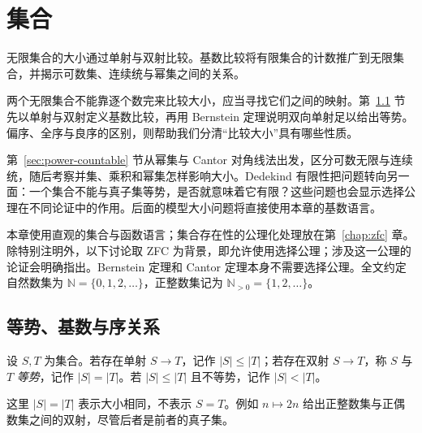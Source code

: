 \documentclass[lang=cn,a4paper,fontset=none,zihao=false,10pt,openany,twoside]{beautybook}
\numberwithin{algorithm}{chapter}
\newcommand{\N}{\mathbb N}
\begin{document}
\frontmatter
\tableofcontents
{}
\mainmatter
\chapter{集合}\label{chap:sets}
\begin{wenxintishi}
无限集合的大小通过单射与双射比较。基数比较将有限集合的计数推广到无限集合，并揭示可数集、连续统与幂集之间的关系。
\end{wenxintishi}
两个无限集合不能靠逐个数完来比较大小，应当寻找它们之间的映射。第~\ref{sec:cardinal-order} 节先以单射与双射定义基数比较，再用 Bernstein 定理说明双向单射足以给出等势。偏序、全序与良序的区别，则帮助我们分清“比较大小”具有哪些性质。

第~\ref{sec:power-countable} 节从幂集与 Cantor 对角线法出发，区分可数无限与连续统，随后考察并集、乘积和幂集怎样影响大小。Dedekind 有限性把问题转向另一面：一个集合不能与真子集等势，是否就意味着它有限？这些问题也会显示选择公理在不同论证中的作用。后面的模型大小问题将直接使用本章的基数语言。

\begin{center}
\end{center}

本章使用直观的集合与函数语言；集合存在性的公理化处理放在第~\ref{chap:zfc} 章。除特别注明外，以下讨论取 ZFC 为背景，即允许使用选择公理；涉及这一公理的论证会明确指出。Bernstein 定理和 Cantor 定理本身不需要选择公理。全文约定自然数集为 $\N=\{0,1,2,\ldots\}$，正整数集记为 $\N_{>0}=\{1,2,\ldots\}$。
\section{等势、基数与序关系}\label{sec:cardinal-order}
\begin{definition}
设 $S,T$ 为集合。若存在单射 $S\to T$，记作 $|S|\leq |T|$；若存在双射 $S\to T$，称 $S$ 与 $T$ \emph{等势}，记作 $|S|=|T|$。若 $|S|\leq|T|$ 且不等势，记作 $|S|<|T|$。
\end{definition}
这里 $|S|=|T|$ 表示大小相同，不表示 $S=T$。例如 $n\mapsto 2n$ 给出正整数集与正偶数集之间的双射，尽管后者是前者的真子集。
\end{document}
